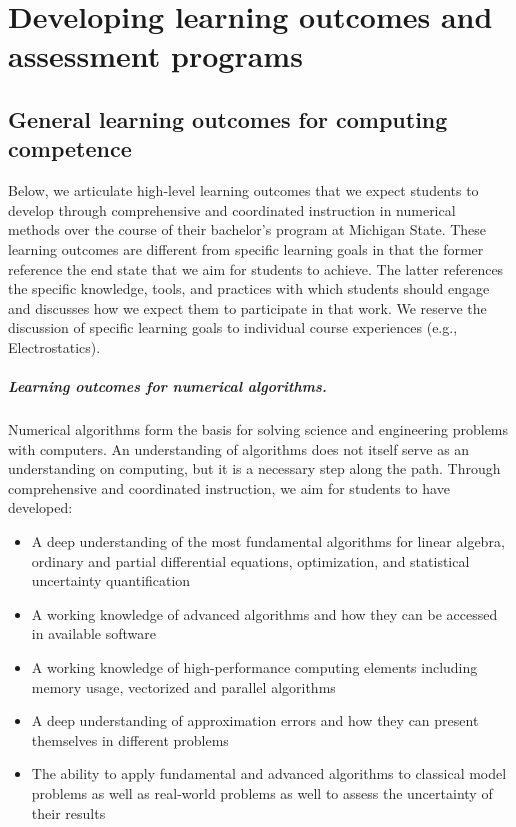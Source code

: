 \chapter{Developing learning outcomes and assessment programs} 



\section*{General learning outcomes for computing competence}

Below, we articulate high-level learning outcomes that we expect students to develop through comprehensive and coordinated instruction in numerical methods over the course of their bachelor's program at Michigan State. These learning outcomes are different from specific learning goals in that the former reference the end state that we aim for students to achieve. The latter references the specific knowledge, tools, and practices with which students should engage and discusses how we expect them to participate in that work. We reserve the discussion of specific learning goals to individual course experiences (e.g., Electrostatics).

\paragraph{Learning outcomes for numerical algorithms.}
Numerical algorithms form the basis for solving science and engineering problems with computers. An understanding of algorithms does not itself serve as an understanding on computing, but it is a necessary step along the path. Through comprehensive and coordinated instruction, we aim for students to have developed:

\begin{itemize}
\item A deep understanding of the most fundamental algorithms for linear algebra, ordinary and partial differential equations, optimization, and statistical uncertainty quantification

\item A working knowledge of advanced algorithms and how they can be accessed in available software

\item A working knowledge of high-performance computing elements including memory usage, vectorized and parallel algorithms

\item A deep understanding of approximation errors and how they can present themselves in different problems

\item The ability to apply fundamental and advanced algorithms to classical model problems as well as real-world problems as well to assess the uncertainty of their results
\end{itemize}

